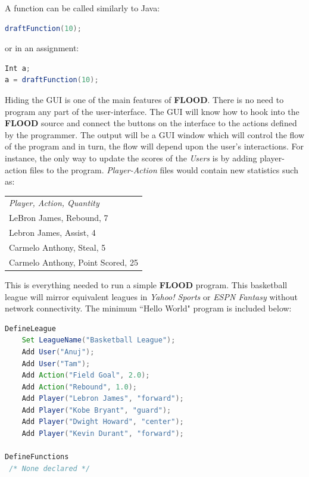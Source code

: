 \documentclass[12pt]{report}
\begin{document}
A function can be called similarly to Java:

\begin{singlespace}
\begin{lstlisting}[language=Java,label=some-code,caption={Function call.}]
draftFunction(10);
\end{lstlisting}
\end{singlespace}

or in an assignment:

\begin{singlespace}
\begin{lstlisting}[language=Java,label=some-code,caption={Function call in an assignment.}]
Int a;
a = draftFunction(10);
\end{lstlisting}
\end{singlespace}

Hiding the GUI is one of the main features of \textbf{FLOOD}. There is no need to program any part of the user-interface. The GUI will know how to hook into the \textbf{FLOOD} source and connect the buttons on the interface to the actions defined by the programmer. The output will be a GUI window which will control the flow of the program and in turn, the flow will depend upon the user's interactions. For instance, the only way to update the scores of the \textit{Users} is by adding player-action files to the program. \textit{Player-Action} files would contain new statistics such as:
\begin{center}
\begin{singlespace}
\begin{tabular}{ l }
\textit{Player, Action, Quantity}\\
LeBron James, Rebound, 7 \\
Lebron James, Assist, 4  \\
Carmelo Anthony, Steal, 5 \\
Carmelo Anthony, Point Scored, 25
\end{tabular}
\end{singlespace}
\end{center}

This is everything needed to run a simple \textbf{FLOOD} program. This basketball league will mirror equivalent leagues in \textit{Yahoo! Sports} or \textit{ESPN Fantasy} without network connectivity. The minimum ``Hello World" program is included below:

\begin{singlespace}
\begin{lstlisting}[language=Java,label=some-code,caption={Minimal FLOOD program to create a basektball fantasy league.}]
DefineLeague
	Set LeagueName("Basketball League");
	Add User("Anuj");
	Add User("Tam");
	Add Action("Field Goal", 2.0);
	Add Action("Rebound", 1.0);
	Add Player("Lebron James", "forward");
	Add Player("Kobe Bryant", "guard");
	Add Player("Dwight Howard", "center");
	Add Player("Kevin Durant", "forward");

DefineFunctions
 /* None declared */
\end{lstlisting}
\end{singlespace}
\end{document}
